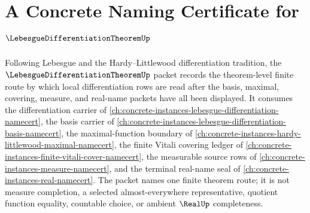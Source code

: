 \chapter{A Concrete Naming Certificate for $\LebesgueDifferentiationTheoremUp$}
\label{ch:concrete-instances-lebesgue-differentiation-theorem-namecert}

Following Lebesgue and the Hardy--Littlewood differentiation tradition, the $\LebesgueDifferentiationTheoremUp$ packet records the theorem-level finite route by which local differentiation rows are read after the basis, maximal, covering, measure, and real-name packets have all been displayed. It consumes the differentiation carrier of \autoref{ch:concrete-instances-lebesgue-differentiation-namecert}, the basis carrier of \autoref{ch:concrete-instances-lebesgue-differentiation-basis-namecert}, the maximal-function boundary of \autoref{ch:concrete-instances-hardy-littlewood-maximal-namecert}, the finite Vitali covering ledger of \autoref{ch:concrete-instances-finite-vitali-cover-namecert}, the measurable source rows of \autoref{ch:concrete-instances-measure-namecert}, and the terminal real-name seal of \autoref{ch:concrete-instances-real-namecert}. The packet names one finite theorem route; it is not measure completion, a selected almost-everywhere representative, quotient function equality, countable choice, or ambient $\RealUp$ completeness.

